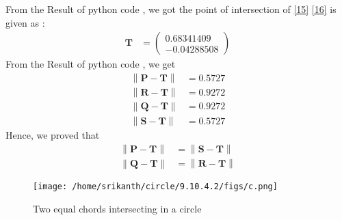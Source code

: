 \documentclass[jornel,10pt,twocolumn]{article}
\providecommand{\norm}[1]{\left\lVert#1\right\rVert}
\newcommand{\myvec}[1]{\ensuremath{\begin{pmatrix}#1\end{pmatrix}}}
\let\vec\mathbf
\begin{document}
From the Result of python code , we got the point of intersection of \eqref{15} \eqref{16}  is given as :
\begin{align}
\vec{T}&=\myvec{0.68341409\\-0.04288508}
\end{align}
From the Result of python code , we get
\begin{align}
\norm{\vec{P}-\vec{T}}&=0.5727\\
\norm{\vec{R}-\vec{T}}&=0.9272\\
\norm{\vec{Q}-\vec{T}}&=0.9272\\
\norm{\vec{S}-\vec{T}}&=0.5727
\end{align}
Hence, we proved that
\begin{align}
\norm{\vec{P}-\vec{T}}&=\norm{\vec{S}-\vec{T}}\\
\norm{\vec{Q}-\vec{T}}&=\norm{\vec{R}-\vec{T}}
\end{align} 
\begin{figure}[!h]
	\begin{center} 
	  \texttt{[image: /home/srikanth/circle/9.10.4.2/figs/c.png]}
	\end{center}
\caption{Two equal chords intersecting in a circle}
\label{fig:Fig1}
\end{figure}
\end{document}
